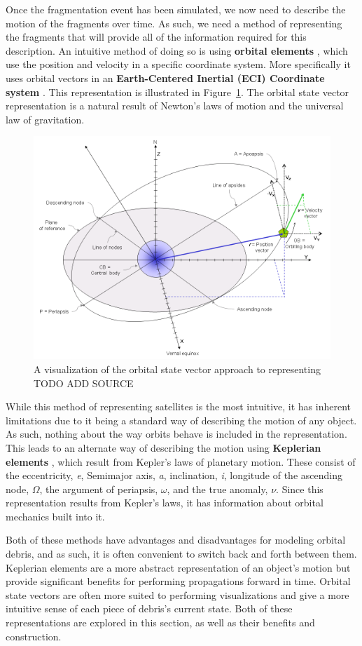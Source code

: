 \documentclass[a4paper, 12pt]{article}
\newcommand{\lindex}[1]{%
	\lowercase{\def\temp{#1}}%
	\expandafter\index\expandafter{\temp}%
}
\newcommand{\boldindex}[1]{%
	\textbf{#1}\lindex{#1}%
}
\begin{document}
Once the fragmentation event has been simulated, we now need to describe the motion of the fragments over time. As such, we need a method of representing the fragments that will provide all of the information required for this description. An intuitive method of doing so is using \boldindex{orbital elements}, which use the position and velocity in a specific coordinate system. More specifically it uses orbital vectors in an \boldindex{Earth-Centered Inertial (ECI) Coordinate system}. This representation is illustrated in Figure~\ref{fig:state_vectors}. The orbital state vector representation is a natural result of Newton's laws of motion and the universal law of gravitation.

\begin{figure}[H]
	\centering
	\includegraphics[width=0.75\linewidth]{Orbital_state_vectors}
	\caption{A visualization of the orbital state vector approach to representing TODO ADD SOURCE }
	\label{fig:state_vectors}
\end{figure}

While this method of representing satellites is the most intuitive, it has inherent limitations due to it being a standard way of describing the motion of any object. As such, nothing about the way orbits behave is included in the representation. This leads to an alternate way of describing the motion using  \boldindex{Keplerian elements}, which result from Kepler's laws of planetary motion. These consist of the eccentricity, \emph{e}, Semimajor axis, \emph{a}, inclination, \emph{i}, longitude of the ascending node, $\Omega$, the argument of periapsis, $\omega$, and the true anomaly, $\nu$. Since this representation results from Kepler's laws, it has information about orbital mechanics built into it.

Both of these methods have advantages and disadvantages for modeling orbital debris, and as such, it is often convenient to switch back and forth between them. Keplerian elements are a more abstract representation of an object's motion but provide significant benefits for performing propagations forward in time. Orbital state vectors are often more suited to performing visualizations and give a more intuitive sense of each piece of debris's current state. Both of these representations are explored in this section, as well as their benefits and construction.
\end{document}
